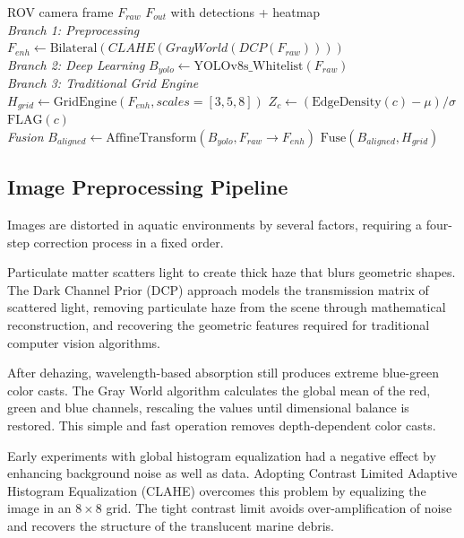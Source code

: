 \documentclass[conference]{IEEEtran}
\begin{document}
\begin{algorithm}[htbp]
\caption{AquaScan Dual-Stream Detection}
\label{alg:aquascan}
\begin{algorithmic}[1]
\renewcommand{\algorithmicrequire}{\textbf{Input:}}
\renewcommand{\algorithmicensure}{\textbf{Output:}}
\REQUIRE ROV camera frame $F_{raw}$
\ENSURE $F_{out}$ with detections + heatmap
\\ \textit{Branch 1: Preprocessing}
\STATE $F_{enh} \leftarrow \text{Bilateral}(CLAHE(GrayWorld(DCP(F_{raw}))))$
\\ \textit{Branch 2: Deep Learning}
\STATE $B_{yolo} \leftarrow \text{YOLOv8s\_Whitelist}(F_{raw})$ 
\\ \textit{Branch 3: Traditional Grid Engine}
\STATE $H_{grid} \leftarrow \text{GridEngine}(F_{enh}, scales=[3,5,8])$
    \STATE $Z_c \leftarrow (\text{EdgeDensity}(c) - \mu) / \sigma$
        \STATE $\text{FLAG}(c)$
    \ENDIF
\ENDFOR
\\ \textit{Fusion}
\STATE $B_{aligned} \leftarrow \text{AffineTransform}(B_{yolo}, F_{raw} \rightarrow F_{enh})$
\RETURN $\text{Fuse}(B_{aligned}, H_{grid})$
\end{algorithmic}
\end{algorithm}

\subsection{Image Preprocessing Pipeline}
Images are distorted in aquatic environments by several factors, requiring a four-step correction process in a fixed order.

Particulate matter scatters light to create thick haze that blurs geometric shapes. The Dark Channel Prior (DCP) approach \cite{b7} models the transmission matrix of scattered light, removing particulate haze from the scene through mathematical reconstruction, and recovering the geometric features required for traditional computer vision algorithms.

After dehazing, wavelength-based absorption still produces extreme blue-green color casts. The Gray World algorithm \cite{b15} calculates the global mean of the red, green and blue channels, rescaling the values until dimensional balance is restored. This simple and fast operation removes depth-dependent color casts.

Early experiments with global histogram equalization had a negative effect by enhancing background noise as well as data. Adopting Contrast Limited Adaptive Histogram Equalization (CLAHE) \cite{b10} overcomes this problem by equalizing the image in an $8\times8$ grid. The tight contrast limit avoids over-amplification of noise and recovers the structure of the translucent marine debris.
\end{document}
